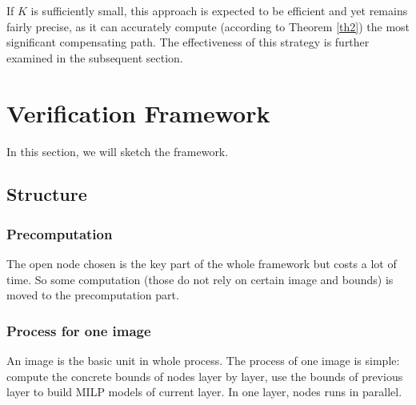 If $K$ is sufficiently small, 
this approach is expected to be efficient and yet remains fairly precise, as it can accurately compute (according to Theorem \ref{th2}) the most significant compensating path. The effectiveness of this strategy is further examined in the subsequent section.



\iffalse
\section{Verification Framework}




In this section, we will sketch the framework. 

\subsection{Structure}

\subsubsection*{Precomputation}

The open node chosen is the key part of the whole framework but costs a lot of time. So some computation (those do not rely on certain image and bounds) is moved to the precomputation part.

%



\subsubsection*{Process for one image} An image is the basic unit in whole process. The process of one image is simple: compute the concrete bounds of nodes layer by layer, use the bounds of previous layer to build MILP models of current layer. In one layer, nodes runs in parallel.

